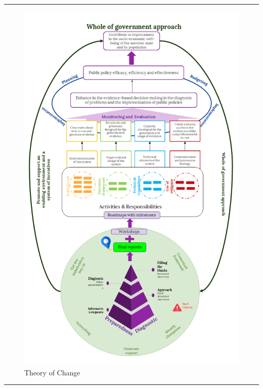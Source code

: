 \documentclass[
  10pt,
]{book}
\begin{document}
\begin{center}\rule{0.5\linewidth}{0.5pt}\end{center}

\begin{figure}

{\centering \includegraphics[width=1\linewidth]{./images/figure_1} 

}

\caption{Theory of Change}\label{fig:figure1}
\end{figure}

\begin{center}\rule{0.5\linewidth}{0.5pt}\end{center}
\end{document}
